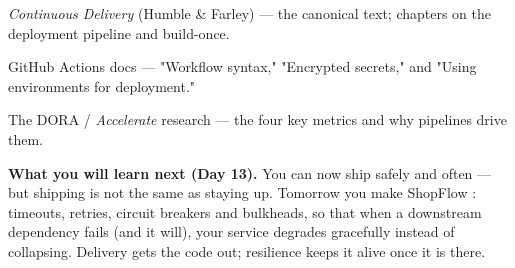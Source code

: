 \begin{wbitem}
  \item \emph{Continuous Delivery} (Humble \& Farley) --- the canonical text; chapters on the deployment pipeline and build-once.
  \item GitHub Actions docs --- "Workflow syntax," "Encrypted secrets," and "Using environments for deployment."
  \item The DORA / \emph{Accelerate} research --- the four key metrics and why pipelines drive them.
\end{wbitem}

\begin{keyidea}
\textbf{What you will learn next (Day 13).} You can now ship safely and often --- but shipping is not the same as staying up. Tomorrow you make ShopFlow : timeouts, retries, circuit breakers and bulkheads, so that when a downstream dependency fails (and it will), your service degrades gracefully instead of collapsing. Delivery gets the code out; resilience keeps it alive once it is there.
\end{keyidea}
